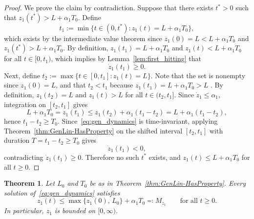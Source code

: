 \documentclass{article}
\newtheorem{theorem}{Theorem}
\begin{document}
\begin{proof}
    We prove the claim by contradiction. Suppose that there exists $t^*>0$ such that 
    $z_1(t^*)>L+\alpha_1 T_0$. Define
    \begin{equation*}
        t_1 := \min\{t\in(0,t^*) : z_1(t)=L+\alpha_1 T_0\},
    \end{equation*}
    which exists by the intermediate value theorem since $z_1(0)=L<L+\alpha_1T_0$ 
    and $z_1(t^*)>L+\alpha_1T_0$. By definition, $z_1(t_1)=L+\alpha_1T_0$ and 
    $z_1(t)<L+\alpha_1T_0$ for all $t\in[0,t_1)$, which implies by Lemma~\ref{lem:first_hitting} that
    \begin{equation*}
        \dot z_1(t_1)\ge 0.
    \end{equation*}
    Next, define $t_2 := \max\{t\in[0,t_1] : z_1(t)=L\}$.    
    Note that the set is nonempty since $z_1(0)=L$, and that
    $t_2<t_1$ because $z_1(t_1)=L+\alpha_1T_0>L$
    . By definition, $z_1(t_2)=L$ and 
    $z_1(t)>L$ for all $t\in(t_2,t_1]$. Since $\dot z_1\le\alpha_1$, 
    integration on $[t_2,t_1]$ gives
    \begin{equation*}
        L+\alpha_1 T_0 = z_1(t_1) \le z_1(t_2)+\alpha_1(t_1-t_2)
        = L + \alpha_1(t_1-t_2),
    \end{equation*}
    hence $t_1-t_2\ge T_0$. Since~\eqref{eq:gen_dynamics} is time-invariant, 
    applying Theorem~\ref{thm:GenLin-HasProperty} on the shifted interval 
    $[t_2,t_1]$ with duration $T=t_1-t_2\ge T_0$ gives
    \begin{equation*}
        \dot z_1(t_1)<0,
    \end{equation*}
    contradicting $\dot z_1(t_1)\ge 0$. 
    Therefore no such $t^*$ exists, and $z_1(t)\le L+\alpha_1 T_0$ for all $t\ge 0$.
\end{proof}

\begin{theorem}\label{thm:z1_bounded}
    Let $L_0$ and $T_0$ be as in Theorem~\ref{thm:GenLin-HasProperty}. Every 
    solution of~\eqref{eq:gen_dynamics} satisfies
    \begin{equation*}
        z_1(t) \le \max\{z_1(0),\,L_0\} + \alpha_1 T_0 \eqqcolon M_{z_1} 
        \qquad\text{for all } t\ge 0.
    \end{equation*}
    In particular, $z_1$ is bounded on $[0,\infty)$.
\end{theorem}
\end{document}

